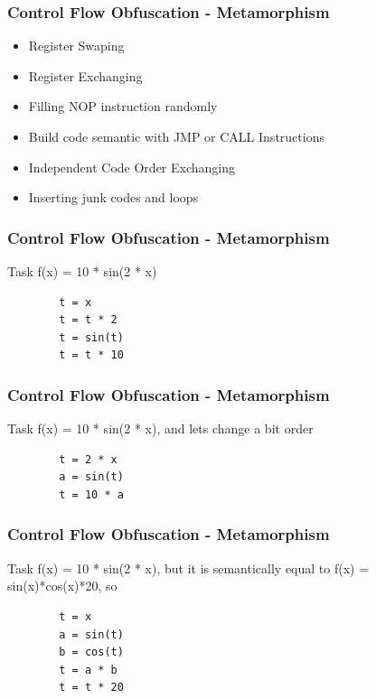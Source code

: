 \documentclass{beamer}
\begin{document}

\begin{frame} 
\frametitle{Control Flow Obfuscation - Metamorphism}
\begin{itemize}
\item Register Swaping
\item Register Exchanging
\item Filling NOP instruction randomly
\item Build code semantic with JMP or CALL Instructions
\item Independent Code Order Exchanging 
\item Inserting junk codes and loops
\end{itemize}
\end{frame}

\begin{frame} 
\frametitle{Control Flow Obfuscation - Metamorphism}
Task f(x) = 10 * sin(2 * x)
\begin{example}
	\begin{verbatim}
		t = x
		t = t * 2
		t = sin(t) 
		t = t * 10\end{verbatim}
	\end{example}
\end{frame}


\begin{frame} 
\frametitle{Control Flow Obfuscation - Metamorphism}
Task f(x) = 10 * sin(2 * x), and lets change a bit order
\begin{example}
	\begin{verbatim}
		t = 2 * x 
		a = sin(t) 
		t = 10 * a\end{verbatim}
	\end{example}
\end{frame}


\begin{frame} 
\frametitle{Control Flow Obfuscation - Metamorphism}
Task f(x) = 10 * sin(2 * x), but it is semantically equal to f(x) = sin(x)*cos(x)*20, so
\begin{example}
	\begin{verbatim}
		t = x
		a = sin(t)
		b = cos(t)
		t = a * b
		t = t * 20\end{verbatim}
	\end{example}
\end{frame}
\end{document}
